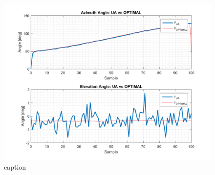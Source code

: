 \begin{figure}[H]
	\centering
	\includegraphics[scale=0.75]{figures/s1_pd_ua.png}
	\caption{caption}
	\label{fig:s1_pd_ua_alone}
\end{figure}


